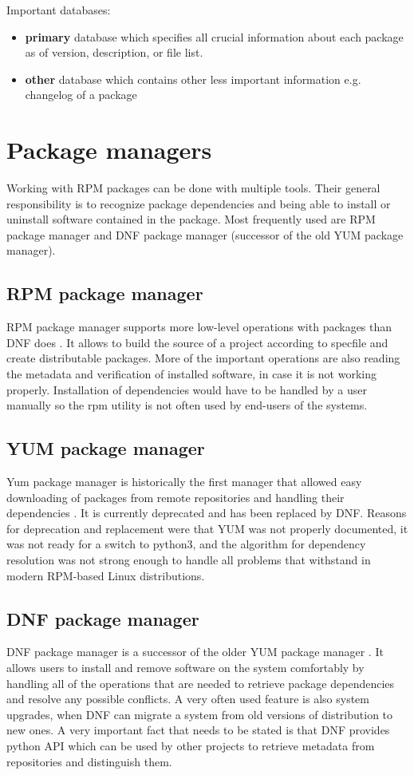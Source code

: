 Important databases:
\begin{itemize}
  \item \textbf{primary} database which specifies all crucial information about each package as of version, description, or file list.
  \item \textbf{other} database which contains other less important information e.g. changelog of a package
\end{itemize}

\section{Package managers}
Working with RPM packages can be done with multiple tools. Their general responsibility is to recognize
package dependencies and being able to install or uninstall software contained in the package.
Most frequently used are RPM package manager and DNF package manager (successor of the old
YUM package manager).

\subsection*{RPM package manager}
RPM package manager supports more low-level operations with packages than DNF does \cite{RPMPackageManager}. It allows
to build the source of a project according to specfile and create distributable packages. More of the
important operations are also reading the metadata and verification of installed software, in
case it is not working properly. Installation of dependencies would have to be handled by a user
manually so the rpm utility is not often used by end-users of the systems.

\subsection*{YUM package manager}
Yum package manager is historically the first manager that allowed easy downloading of packages
from remote repositories and handling their dependencies \cite{YUMPackageManager}. It is currently deprecated and has been
replaced by DNF. Reasons for deprecation and replacement were that YUM was not properly documented,
it was not ready for a switch to python3, and the algorithm for dependency resolution was not strong enough
to handle all problems that withstand in modern RPM-based Linux distributions.

\subsection*{DNF package manager}
DNF package manager is a successor of the older YUM package manager \cite{DNFPackageManager}. It allows users to install and remove software
on the system comfortably by handling all of the operations that are needed to retrieve package dependencies
and resolve any possible conflicts. A very often used feature is also system upgrades, when
DNF can migrate a system from old versions of distribution to new ones. A very important fact
that needs to be stated is that DNF provides python API which can be used by other projects to retrieve metadata
from repositories and distinguish them.

